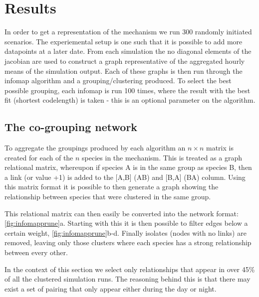 
\section{Results}

In order to get a representation of the mechanism we run 300 randomly initiated scenarios. The experiemental setup is one such that it is possible to add more datapoints at a later date. From each simulation the no diagonal elements of the jacobian are used to construct a graph representative of the aggregated hourly means of the simulation output. Each of these graphs is then run through the infomap algorithm and a grouping/clustering produced. To select the best possible grouping, each infomap is run 100 times, where the result with the best fit (shortest codelength) is taken - this is an optional parameter on the algorithm.

\subsection{The co-grouping network}

To aggregate the groupings produced by each algorithm an $n\times n$ matrix is created for each of the $n$ species in the mechanism. This is treated as a graph relational matrix, whereupon if species A is in the same group as species B, then a link (or value +1) is added to the [A,B] (A\ce{->}B) and [B,A] (B\ce{->}A) column. Using this matrix format it is possible to then generate a graph showing the relationship between species that were clustered in the same group.

This relational matrix can then easily be converted into the network format: \autoref{fig:infomapprune}a. Starting with this it is then possible to filter edges below a certain weight, \autoref{fig:infomapprune}b-d. Finally isolates (nodes with no links) are removed, leaving only those clusters where each species has a strong relationship between every other. 

In the context of this section we select only relationships that appear in over 45\% of all the clustered simulation runs. The reasoning behind this is that there may exist a set of pairing that only appear either during the day or night.  

